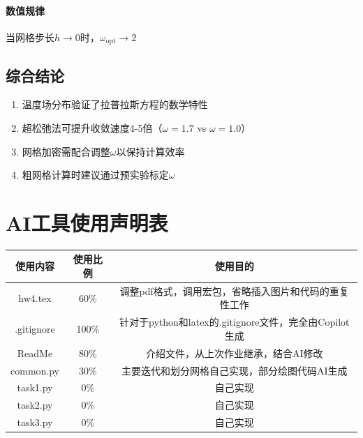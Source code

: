 \documentclass[UTF8]{ctexart}
\begin{document}
\paragraph{数值规律}
当网格步长$h \to 0$时，$\omega_{\mathrm{opt}} \to 2$



\subsection{综合结论}
\begin{enumerate}[label=\arabic*), leftmargin=3em]
    \item 温度场分布验证了拉普拉斯方程的数学特性
    \item 超松弛法可提升收敛速度4-5倍（$\omega=1.7$ vs $\omega=1.0$）
    \item 网格加密需配合调整$\omega$以保持计算效率
    \item 粗网格计算时建议通过预实验标定$\omega$
\end{enumerate}


\newpage
\appendix
\section{AI工具使用声明表}
\begin{table}[H]
    \centering
    \begin{tabular}{c|c|c}
        \hline
        使用内容 & 使用比例 & 使用目的 \\ \hline
        hw4.tex & 60\% & 调整pdf格式，调用宏包，省略插入图片和代码的重复性工作 \\ 
        .gitignore & 100\% & 针对于python和latex的.gitignore文件，完全由Copilot生成  \\
        ReadMe & 80\% & 介绍文件，从上次作业继承，结合AI修改 \\
        common.py & 30\% & 主要迭代和划分网格自己实现，部分绘图代码AI生成  \\
        task1.py & 0\% & 自己实现 \\
        task2.py & 0\% & 自己实现 \\
        task3.py & 0\% & 自己实现 \\
        \hline
    \end{tabular}
    \label{tab:AI_tools}
\end{table}
\end{document}
